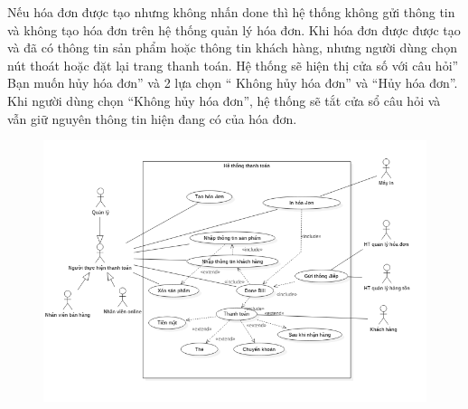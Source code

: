 \documentclass{article}
\begin{document}
Nếu hóa đơn được tạo nhưng không nhấn done thì hệ thống không gửi thông tin và không tạo hóa đơn trên hệ thống quản lý hóa đơn.
Khi hóa đơn được được tạo và đã có thông tin sản phẩm hoặc thông tin khách hàng, nhưng người dùng chọn nút thoát hoặc  đặt lại trang thanh toán. Hệ thống sẽ hiện thị cửa số với câu hỏi” Bạn muốn hủy hóa đơn” và 2 lựa chọn “ Không hủy hóa đơn” và “Hủy hóa đơn”. Khi người dùng chọn “Không hủy hóa đơn”, hệ thống sẽ tắt cửa sổ câu hỏi và vẫn giữ nguyên thông tin hiện đang có của hóa đơn.
\begin{figure}
    \centering
    \includegraphics{4.png}
\end{figure}


\pagebreak
\end{document}
